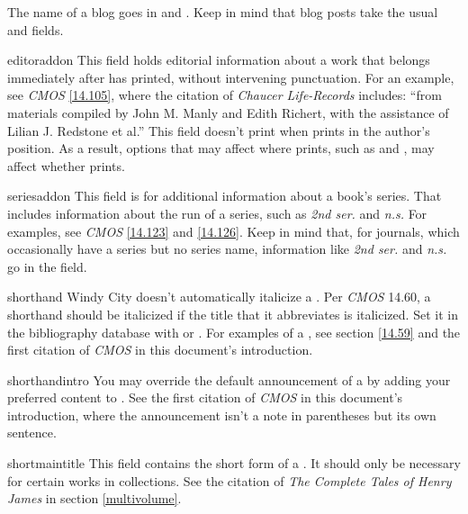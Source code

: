 \documentclass[11pt,letterpaper,oneside]{article}
\begin{document}
\begin{marglist}

\item[\smash{\tshortstack[l]{blogtitle\\blogsubtitle}}] The name of a
blog goes in  and . Keep in
mind that blog posts take the usual  and
 fields.

\item[editoraddon] This field holds editorial information about a work
that belongs immediately after  has printed, without
intervening punctuation. For an example, see \textit{CMOS}
\ref{14.105}, where the citation of \textit{Chaucer Life-Records}
includes: ``from materials compiled by John M. Manly and Edith
Richert, with the assistance of Lilian J. Redstone et al.'' This field
doesn't print when  prints in the author's position.
As a result, options that may affect where  prints,
such as  and , may affect whether
 prints.



\item[seriesaddon] This field is for additional information about a
book's series. That includes information about the run of a series,
such as \textit{2nd ser.} and \textit{n.s.} For examples, see
\textit{CMOS} \ref{14.123} and \ref{14.126}. Keep in mind that, for
journals, which occasionally have a series but no series name,
information like \textit{2nd ser.} and \textit{n.s.} go in the
 field.

\item[shorthand] Windy City doesn't automatically italicize a
. Per \textit{CMOS} 14.60, a shorthand should be
italicized if the title that it abbreviates is italicized. Set it in
the bibliography database with  or . For
examples of a , see section \ref{14.59} and the
first citation of \textit{CMOS} in this document's introduction.

\item[shorthandintro] You may override the default announcement of a
 by adding your preferred content to
. See the first citation of \textit{CMOS} in
this document's introduction, where the announcement isn't a note in
parentheses but its own sentence.

\item[shortmaintitle] This field contains the short form of a
. It should only be necessary for certain works in
collections. See the citation of \textit{The Complete Tales of Henry
James} in section \ref{multivolume}.

\end{marglist}
\end{document}

